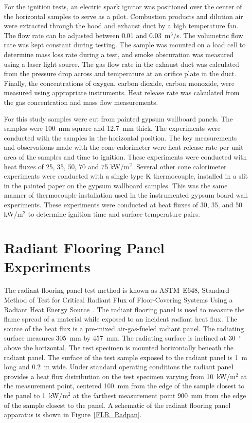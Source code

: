 \documentclass[twoside]{uocthesis}
\begin{document}
For the ignition tests, an electric spark ignitor was positioned over the center of the horizontal samples to serve as a pilot.  Combustion products and dilution air were extracted through the hood and exhaust duct by a high temperature fan. The flow rate can be adjusted between 0.01 and 0.03~m$^3$/s. The volumetric flow rate was kept constant during testing. The sample was mounted on a load cell to determine mass loss rate during a test, and smoke obscuration was measured using a laser light source. The gas flow rate in the exhaust duct was calculated from the pressure drop across and temperature at an orifice plate in the duct. Finally, the concentrations of oxygen, carbon dioxide, carbon monoxide, were measured using appropriate instruments. Heat release rate was calculated from the gas concentration and mass flow measurements.

For this study samples were cut from painted gypsum wallboard panels. The samples were 100~mm square and 12.7~mm thick. The experiments were conducted with the samples in the horizontal position.  The key measurements and observations made with the cone calorimeter were heat release rate per unit area of the samples and time to ignition. These experiments were conducted with heat fluxes of 25, 35, 50, 70 and 75 kW/m$^2$. Several other cone calorimeter experiments were conducted with a single type K thermocouple, installed in a slit in the painted paper on the gypsum wallboard samples.  This was the same manner of thermocouple installation used in the instrumented gypsum board wall experiments.  These experiments were conducted at heat fluxes of 30, 35, and 50 kW/m$^2$ to determine ignition time and surface temperature pairs.

\section{Radiant Flooring Panel Experiments}

The radiant flooring panel test method is known as ASTM~E648, Standard Method of Test for Critical Radiant Flux of Floor-Covering Systems Using a Radiant Heat Energy Source~\cite{ASTM_E648}.  The radiant flooring panel is used to measure the flame spread of a material while exposed to an incident radiant heat flux. The source of the heat flux is a pre-mixed air-gas-fueled radiant panel.  The radiating surface measures 305~mm by 457~mm. The radiating surface is inclined at 30~$^{\circ}$ above the horizontal. The test specimen is mounted horizontally beneath the radiant panel.  The surface of the test sample exposed to the radiant panel is 1~m long and 0.2~m wide. Under standard operating conditions the radiant panel provides a heat flux distribution on the test specimen varying from 10~kW/m$^2$ at the measurement point, centered 100~mm from the edge of the sample closest to the panel to 1~kW/m$^2$ at the farthest measurement point 900~mm from the edge of the sample closest to the panel. A schematic of the radiant flooring panel apparatus is shown in Figure~\ref{FLR_Radpan}.  
\end{document}
